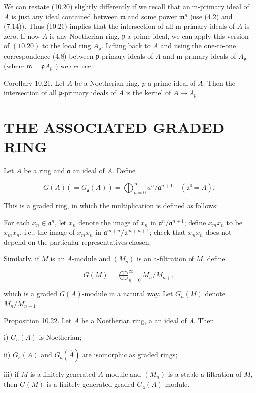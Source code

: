 \documentclass{standalone}
\theoremstyle{definition}
\theoremstyle{remark}
\begin{document}
We can restate (10.20) slightly differently if we recall that an m-primary ideal of $A$ is just any ideal contained between $\mathfrak{m}$ and some power $\mathfrak{m}^{n}$ (use (4.2) and (7.14)). Thus (10.20) implies that the intersection of all m-primary ideals of $A$ is zero. If now $A$ is any Noetherian ring, $\mathfrak{p}$ a prime ideal, we can apply this version of $(10.20)$ to the local ring $A_{\mathfrak{p}}$. Lifting back to $A$ and using the one-to-one correspondence (4.8) between $\mathfrak{p}$-primary ideals of $A$ and m-primary ideals of $A_{\mathfrak{p}}$ (where $\mathfrak{m}=\mathfrak{p} A_{\mathfrak{p}}$ ) we deduce:

Corollary 10.21. Let $A$ be a Noetherian ring, $p$ a prime ideal of $A$. Then the intersection of all $\mathfrak{p}$-primary ideals of $A$ is the kernel of $A \rightarrow A_{\mathfrak{p}}$.

\section{THE ASSOCIATED GRADED RING}
Let $A$ be a ring and $\mathfrak{a}$ an ideal of $A$. Define

\[
G(A)\left(=G_{\mathfrak{a}}(A)\right)=\bigoplus_{n=0}^{\infty} a^{n} / \mathfrak{a}^{n+1} \quad\left(\mathfrak{a}^{0}=A\right) .
\]

This is a graded ring, in which the multiplication is defined as follows:

For each $x_{n} \in \mathfrak{a}^{n}$, let $\bar{x}_{n}$ denote the image of $x_{n}$ in $\mathfrak{a}^{n} / \mathfrak{a}^{n+1}$; define $\bar{x}_{m} \bar{x}_{n}$ to be $\overline{x_{m} x_{n}}$, i.e., the image of $x_{m} x_{n}$ in $\mathfrak{a}^{m+n} / \mathfrak{a}^{m+n+1}$; check that $\bar{x}_{m} \bar{x}_{n}$ does not depend on the particular representatives chosen.

Similarly, if $M$ is an $A$-module and $\left(M_{n}\right)$ is an a-filtration of $M$, define

\[
G(M)=\bigoplus_{n=0}^{\infty} M_{n} / M_{n+1}
\]

which is a graded $G(A)$-module in a natural way. Let $G_{n}(M)$ denote $M_{n} / M_{n+1}$.

Proposition 10.22. Let $A$ be a Noetherian ring, a an ideal of $A$. Then

i) $G_{a}(A)$ is Noetherian;

ii) $G_{\mathfrak{a}}(A)$ and $G_{\hat{a}}(\hat{A})$ are isomorphic as graded rings;

iii) if $M$ is a finitely-generated $A$-module and $\left(M_{n}\right)$ is a stable a-filtration of $M$, then $G(M)$ is a finitely-generated graded $G_{\mathfrak{a}}(A)$-module.
\end{document}
